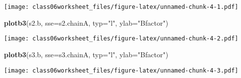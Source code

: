 \documentclass[]{article}
\newenvironment{Shaded}{\begin{snugshade}}{\end{snugshade}}
\newcommand{\KeywordTok}[1]{\textcolor[rgb]{0.13,0.29,0.53}{\textbf{#1}}}
\newcommand{\DataTypeTok}[1]{\textcolor[rgb]{0.13,0.29,0.53}{#1}}
\newcommand{\StringTok}[1]{\textcolor[rgb]{0.31,0.60,0.02}{#1}}
\newcommand{\NormalTok}[1]{#1}
\begin{document}
\texttt{[image: class06worksheet\_files/figure-latex/unnamed-chunk-4-1.pdf]}

\begin{Shaded}
\begin{Highlighting}[]
\KeywordTok{plotb3}\NormalTok{(s2.b, }\DataTypeTok{sse=}\NormalTok{s2.chainA, }\DataTypeTok{typ=}\StringTok{"l"}\NormalTok{, }\DataTypeTok{ylab=}\StringTok{"Bfactor"}\NormalTok{)}
\end{Highlighting}
\end{Shaded}

\texttt{[image: class06worksheet\_files/figure-latex/unnamed-chunk-4-2.pdf]}

\begin{Shaded}
\begin{Highlighting}[]
\KeywordTok{plotb3}\NormalTok{(s3.b, }\DataTypeTok{sse=}\NormalTok{s3.chainA, }\DataTypeTok{typ=}\StringTok{"l"}\NormalTok{, }\DataTypeTok{ylab=}\StringTok{"Bfactor"}\NormalTok{)}
\end{Highlighting}
\end{Shaded}

\texttt{[image: class06worksheet\_files/figure-latex/unnamed-chunk-4-3.pdf]}
\end{document}

